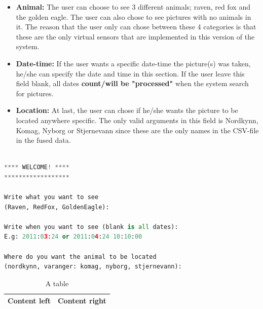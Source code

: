 \documentclass[USenglish]{uit-thesis}
\begin{document}
\begin{itemize}
\item \textbf{Animal:} The user can choose to see 3 different animals; raven, red fox and the golden eagle. The user can also chose to see pictures with no animals in it. The reason that the user only can chose between these 4 categories is that these are the only virtual sensors that are implemented in this version of the system.

\item \textbf{Date-time:} If the user wants a specific date-time the picture(s) was taken, he/she can specify the date and time in this section. If the user leave this field blank, all dates \textbf{count/will be "processed"} when the system search for pictures.

\item \textbf{Location:} At last, the user can chose if he/she wants the picture to be located anywhere specific. The only valid arguments in this field is Nordkynn, Komag, Nyborg or Stjernevann since these are the only names in the CSV-file in the fused data.
\end{itemize}

\begin{lstlisting}[frame=single,caption={Main menu },label={lst:mainmenu}, language=Python]

**** WELCOME! ****
******************

Write what you want to see
(Raven, RedFox, GoldenEagle): 

Write when you want to see (blank is all dates): 
E.g: 2011:03:24 or 2011:04:24 10:10:00

Where do you want the animal to be located
(nordkynn, varanger: komag, nyborg, stjernevann):
\end{lstlisting}


\iffalse 
\begin{table}
\centering
\begin{tabular}{|l|l|}
\hline
Content left & Content right\\
\hline
\end{tabular}
\caption{A table}
\end{table}

\end{document}
